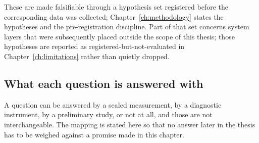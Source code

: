 \noindent These are made falsifiable through a hypothesis set registered before
the corresponding data was collected; Chapter~\ref{ch:methodology} states the
hypotheses and the pre-registration discipline. Part of that set concerns system
layers that were subsequently placed outside the scope of this thesis; those
hypotheses are reported as registered-but-not-evaluated in
Chapter~\ref{ch:limitations} rather than quietly dropped.

\subsection*{What each question is answered with}

A question can be answered by a sealed measurement, by a diagnostic instrument,
by a preliminary study, or not at all, and those are not interchangeable. The
mapping is stated here so that no answer later in the thesis has to be weighed
against a promise made in this chapter.

